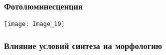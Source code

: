 \begin{frame}
	\frametitle{Фотолюминесценция}
	\centering
	\texttt{[image: Image\_19]}
\end{frame}

\begin{frame}[c]
	\frametitle{Влияние условий синтеза на морфологию}
	\begin{minipage}[t]{1\linewidth}
	\begin{columns}[onlytextwidth]
		\begin{column}{0.4\textwidth}
			\centering
			\\[5pt]
			\begin{minipage}[t]{0.45\linewidth}
			\end{minipage}
			\begin{minipage}[t]{0.45\linewidth}
			\end{minipage}
		\end{column}
		\begin{column}{0.55\textwidth}
			\centering
			\\[5pt]
			\begin{minipage}[t]{0.3\linewidth}
			\end{minipage}
			\begin{minipage}[t]{0.3\linewidth}
			\end{minipage}
			\begin{minipage}[t]{0.3\linewidth}
			\end{minipage}
		\end{column}
	\end{columns}
\end{minipage}
\\[15pt]
	\begin{minipage}[t]{1\linewidth}
	\begin{columns}[onlytextwidth]
			\begin{column}{0.4\textwidth}
				\centering
			\\[5pt]
			\begin{minipage}[t]{0.45\linewidth}
			\end{minipage}
			\begin{minipage}[t]{0.45\linewidth}

\end{minipage}
\end{column}
\end{columns}
\end{minipage}
\end{frame}
